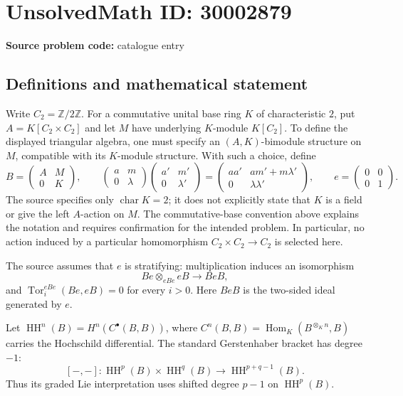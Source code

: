 \documentclass[11pt]{article}
\newcommand{\Z}{\mathbb{Z}}
\begin{document}
\section*{UnsolvedMath ID: 30002879}
\textbf{Source problem code:} catalogue entry
\subsection{Definitions and mathematical statement}
Write \(C_2=\Z/2\Z\). For a commutative unital base ring \(K\) of characteristic \(2\), put \(A=K[C_2\times C_2]\) and let \(M\) have underlying \(K\)-module \(K[C_2]\). To define the displayed triangular algebra, one must specify an \((A,K)\)-bimodule structure on \(M\), compatible with its \(K\)-module structure. With such a choice, define
\[
B=\begin{pmatrix}A&M\\0&K\end{pmatrix},\qquad
\begin{pmatrix}a&m\\0&\lambda\end{pmatrix}
\begin{pmatrix}a'&m'\\0&\lambda'\end{pmatrix}
=\begin{pmatrix}aa'&am'+m\lambda'\\0&\lambda\lambda'\end{pmatrix},
\qquad e=\begin{pmatrix}0&0\\0&1\end{pmatrix}.
\]
The source specifies only \(\operatorname{char}K=2\); it does not explicitly state that \(K\) is a field or give the left \(A\)-action on \(M\). The commutative-base convention above explains the notation and requires confirmation for the intended problem. In particular, no action induced by a particular homomorphism \(C_2\times C_2\to C_2\) is selected here.

The source assumes that \(e\) is stratifying: multiplication induces an isomorphism
\[
Be\otimes_{eBe}eB\longrightarrow BeB,
\]
and \(\operatorname{Tor}^{eBe}_i(Be,eB)=0\) for every \(i>0\). Here \(BeB\) is the two-sided ideal generated by \(e\).

Let \(\operatorname{HH}^n(B)=H^n(C^\bullet(B,B))\), where \(C^n(B,B)=\operatorname{Hom}_K(B^{\otimes_K n},B)\) carries the Hochschild differential. The standard Gerstenhaber bracket has degree \(-1\):
\[
[-,-]\colon\operatorname{HH}^p(B)\times\operatorname{HH}^q(B)\longrightarrow\operatorname{HH}^{p+q-1}(B).
\]
Thus its graded Lie interpretation uses shifted degree \(p-1\) on \(\operatorname{HH}^p(B)\).
\end{document}
